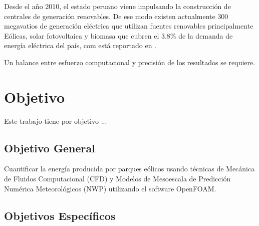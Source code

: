 Desde el año 2010, el estado peruano viene impulsando la construcción de centrales de generación renovables. De ese modo existen actualmente 300 megavatios de generación eléctrica que utilizan fuentes renovables principalmente Eólicas, solar fotovoltaica y biomasa que cubren el 3.8\% de la demanda de energía eléctrica del país, com está reportado en \citep{coes_memoria_2016}.


\hspace*{1em} Un balance entre esfuerzo computacional y precisión de los resultados se requiere.


\section{Objetivo}

Este trabajo tiene por objetivo ...



\subsection{Objetivo General}

Cuantificar la energía producida por parques eólicos usando técnicas de Mecánica de Fluidos Computacional (CFD) y Modelos de Mesoescala de Predicción Numérica  Meteorológicos (NWP) utilizando el software OpenFOAM.

\subsection{Objetivos Específicos}

